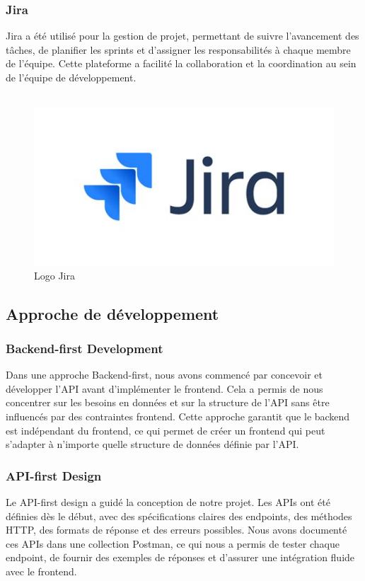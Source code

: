 {\subsubsection*{Jira}
Jira a été utilisé pour la gestion de projet, permettant de suivre l'avancement des tâches, de planifier les sprints et d'assigner les responsabilités à chaque membre de l'équipe. Cette plateforme a facilité la collaboration et la coordination au sein de l'équipe de développement.\\\\

\begin{figure}[H]
\begin{center}
\includegraphics[width=15cm]{assets/presentation/JIRA.jpeg}
\end{center}
\caption{Logo Jira}
\end{figure}


\subsection*{Approche de développement}
\subsubsection*{Backend-first Development}
Dans une approche Backend-first, nous avons commencé par concevoir et développer l'API avant d'implémenter le frontend. Cela a permis de nous concentrer sur les besoins en données et sur la structure de l'API sans être influencés par des contraintes frontend. Cette approche garantit que le backend est indépendant du frontend, ce qui permet de créer un frontend qui peut s'adapter à n'importe quelle structure de données définie par l'API.

\subsubsection*{API-first Design}
Le API-first design a guidé la conception de notre projet. Les APIs ont été définies dès le début, avec des spécifications claires des endpoints, des méthodes HTTP, des formats de réponse et des erreurs possibles. Nous avons documenté ces APIs dans une collection Postman, ce qui nous a permis de tester chaque endpoint, de fournir des exemples de réponses et d’assurer une intégration fluide avec le frontend.

}
